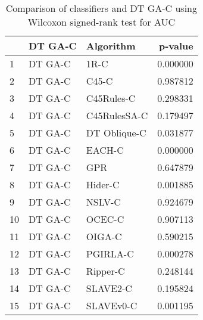 \begin{table}
\footnotesize
\caption{Comparison of classifiers and DT GA-C using Wilcoxon signed-rank test for AUC}
\label{tab:DT GA-C wilcoxon AUC comparison}
\begin{tabular}{lllr}
\hline
 & DT GA-C & Algorithm & p-value \\
\hline
1 & DT GA-C & 1R-C & 0.000000 \\
2 & DT GA-C & C45-C & 0.987812 \\
3 & DT GA-C & C45Rules-C & 0.298331 \\
4 & DT GA-C & C45RulesSA-C & 0.179497 \\
5 & DT GA-C & DT Oblique-C & 0.031877 \\
6 & DT GA-C & EACH-C & 0.000000 \\
7 & DT GA-C & GPR & 0.647879 \\
8 & DT GA-C & Hider-C & 0.001885 \\
9 & DT GA-C & NSLV-C & 0.924679 \\
10 & DT GA-C & OCEC-C & 0.907113 \\
11 & DT GA-C & OIGA-C & 0.590215 \\
12 & DT GA-C & PGIRLA-C & 0.000278 \\
13 & DT GA-C & Ripper-C & 0.248144 \\
14 & DT GA-C & SLAVE2-C & 0.195824 \\
15 & DT GA-C & SLAVEv0-C & 0.001195 \\
\hline
\end{tabular}
\end{table}
